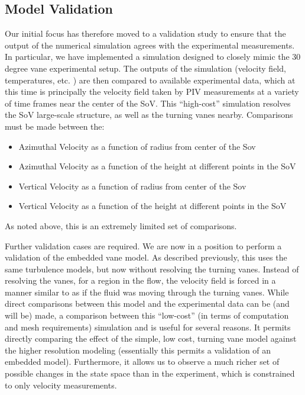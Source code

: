 \documentclass{article}
\begin{document}
\subsection{Model Validation}
Our initial focus has therefore moved to a validation study to ensure that the
output of the numerical simulation agrees with the experimental
measurements. In particular, we have implemented a simulation designed
to closely mimic the 30 degree vane experimental setup. The outputs of
the simulation (velocity field, temperatures, etc. ) are then compared
to available experimental data, which at this time is principally the
velocity field taken by PIV measurements at a variety of time frames
near the center of the SoV. This ``high-cost'' simulation resolves
the SoV large-scale structure, as well as the turning vanes
nearby. Comparisons must be made between the:
\begin{itemize}
 \item Azimuthal Velocity as a function of radius from center of the Sov
 \item Azimuthal Velocity as a function of the height at different
       points in the SoV
 \item Vertical Velocity as a function of radius from center of the Sov
 \item Vertical Velocity as a function of the height at different
       points in the SoV
\end{itemize}
As noted above, this is an extremely limited set of comparisons. 

%
%
Further validation cases are required. We are now in a position to perform
a validation of the embedded vane model. As described previously, this
uses the same turbulence models, but now without resolving the turning
vanes. Instead of resolving the vanes, for a region in the flow, the
velocity field is forced in a manner similar to as if the fluid was
moving through the turning vanes. While direct comparisons between this
model and the experimental data can be (and will be) made, a comparison between this
``low-cost'' (in terms of computation and mesh requirements) simulation
and is useful for several reasons. It permits directly comparing the effect of
the simple, low cost, turning vane model against the higher resolution
modeling (essentially this permits a validation of an embedded
model). Furthermore, it allows us to observe a much richer set of
possible changes in the state space than in the experiment, which is
constrained to only velocity measurements. 
\end{document}
